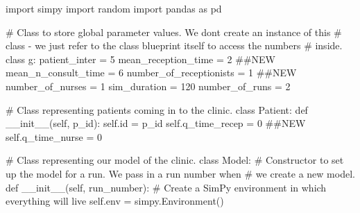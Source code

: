 \documentclass[
  letterpaper,
  DIV=11,
  numbers=noendperiod]{scrreprt}
\newenvironment{Shaded}{\begin{snugshade}}{\end{snugshade}}
\newcommand{\BuiltInTok}[1]{\textcolor[rgb]{0.00,0.23,0.31}{#1}}
\newcommand{\CommentTok}[1]{\textcolor[rgb]{0.37,0.37,0.37}{#1}}
\newcommand{\DecValTok}[1]{\textcolor[rgb]{0.68,0.00,0.00}{#1}}
\newcommand{\FunctionTok}[1]{\textcolor[rgb]{0.28,0.35,0.67}{#1}}
\newcommand{\ImportTok}[1]{\textcolor[rgb]{0.00,0.46,0.62}{#1}}
\newcommand{\KeywordTok}[1]{\textcolor[rgb]{0.00,0.23,0.31}{#1}}
\newcommand{\NormalTok}[1]{\textcolor[rgb]{0.00,0.23,0.31}{#1}}
\newcommand{\OperatorTok}[1]{\textcolor[rgb]{0.37,0.37,0.37}{#1}}
\newcommand{\VariableTok}[1]{\textcolor[rgb]{0.07,0.07,0.07}{#1}}
\begin{document}
\begin{tcolorbox}[enhanced jigsaw, rightrule=.15mm, colback=white, colframe=quarto-callout-note-color-frame, colbacktitle=quarto-callout-note-color!10!white, toprule=.15mm, coltitle=black, opacityback=0, titlerule=0mm, bottomtitle=1mm, breakable, title=\textcolor{quarto-callout-note-color}{\faInfo}\hspace{0.5em}{Click here to view the full code}, opacitybacktitle=0.6, toptitle=1mm, arc=.35mm, bottomrule=.15mm, leftrule=.75mm, left=2mm]

\begin{Shaded}
\begin{Highlighting}[]
\ImportTok{import}\NormalTok{ simpy}
\ImportTok{import}\NormalTok{ random}
\ImportTok{import}\NormalTok{ pandas }\ImportTok{as}\NormalTok{ pd}

\CommentTok{\# Class to store global parameter values.  We don\textquotesingle{}t create an instance of this}
\CommentTok{\# class {-} we just refer to the class blueprint itself to access the numbers}
\CommentTok{\# inside.}
\KeywordTok{class}\NormalTok{ g:}
\NormalTok{    patient\_inter }\OperatorTok{=} \DecValTok{5}
\NormalTok{    mean\_reception\_time }\OperatorTok{=} \DecValTok{2} \CommentTok{\#\#NEW}
\NormalTok{    mean\_n\_consult\_time }\OperatorTok{=} \DecValTok{6}
\NormalTok{    number\_of\_receptionists }\OperatorTok{=} \DecValTok{1} \CommentTok{\#\#NEW}
\NormalTok{    number\_of\_nurses }\OperatorTok{=} \DecValTok{1}
\NormalTok{    sim\_duration }\OperatorTok{=} \DecValTok{120}
\NormalTok{    number\_of\_runs }\OperatorTok{=} \DecValTok{2}

\CommentTok{\# Class representing patients coming in to the clinic.}
\KeywordTok{class}\NormalTok{ Patient:}
    \KeywordTok{def} \FunctionTok{\_\_init\_\_}\NormalTok{(}\VariableTok{self}\NormalTok{, p\_id):}
        \VariableTok{self}\NormalTok{.}\BuiltInTok{id} \OperatorTok{=}\NormalTok{ p\_id}
        \VariableTok{self}\NormalTok{.q\_time\_recep }\OperatorTok{=} \DecValTok{0} \CommentTok{\#\#NEW}
        \VariableTok{self}\NormalTok{.q\_time\_nurse }\OperatorTok{=} \DecValTok{0}

\CommentTok{\# Class representing our model of the clinic.}
\KeywordTok{class}\NormalTok{ Model:}
    \CommentTok{\# Constructor to set up the model for a run.  We pass in a run number when}
    \CommentTok{\# we create a new model.}
    \KeywordTok{def} \FunctionTok{\_\_init\_\_}\NormalTok{(}\VariableTok{self}\NormalTok{, run\_number):}
        \CommentTok{\# Create a SimPy environment in which everything will live}
        \VariableTok{self}\NormalTok{.env }\OperatorTok{=}\NormalTok{ simpy.Environment()}


\end{Highlighting}
\end{Shaded}
\end{tcolorbox}
\end{document}
